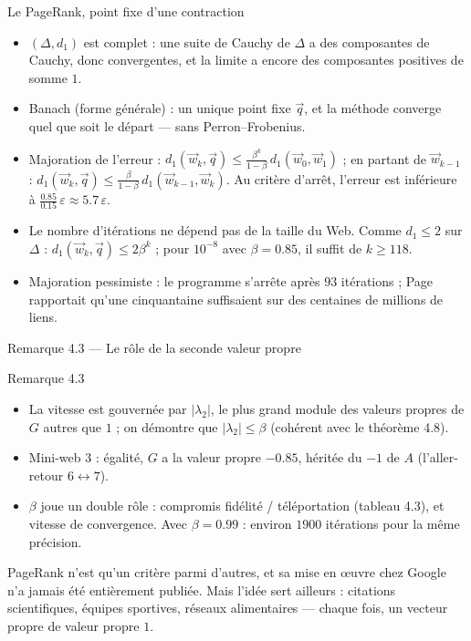 \begin{frame}{Le PageRank, point fixe d'une contraction}
  \small
  \begin{itemize}
    \item $(\Delta,d_1)$ est complet : une suite de Cauchy de $\Delta$ a des
      composantes de Cauchy, donc convergentes, et la limite a encore des
      composantes positives de somme $1$.
    \item Banach (forme générale) : un unique point fixe $\vec q$, et la
      méthode converge quel que soit le départ --- sans Perron--Frobenius.
    \item Majoration de l'erreur :
      $d_1(\vec w_k,\vec q)\leq\frac{\beta^k}{1-\beta}\,d_1(\vec w_0,\vec w_1)$ ;
      en partant de $\vec w_{k-1}$ :
      $d_1(\vec w_k,\vec q)\leq\frac{\beta}{1-\beta}\,d_1(\vec w_{k-1},\vec w_k)$.
      Au critère d'arrêt, l'erreur est inférieure à
      $\frac{\num{0.85}}{\num{0.15}}\,\varepsilon\approx\num{5.7}\,\varepsilon$.
    \item Le nombre d'itérations ne dépend pas de la taille du Web. Comme
      $d_1\leq2$ sur $\Delta$ : $d_1(\vec w_k,\vec q)\leq2\beta^k$ ; pour
      $10^{-8}$ avec $\beta=\num{0.85}$, il suffit de $k\geq118$.
    \item Majoration pessimiste : le programme s'arrête après $93$
      itérations ; Page rapportait qu'une cinquantaine suffisaient sur des
      centaines de millions de liens.
  \end{itemize}
\end{frame}

\begin{frame}{Remarque 4.3 --- Le rôle de la seconde valeur propre}
  \begin{Rem}{Remarque 4.3}
    \small
    \begin{itemize}
      \item La vitesse est gouvernée par $|\lambda_2|$, le plus grand
        module des valeurs propres de $G$ autres que $1$ ; on démontre que
        $|\lambda_2|\leq\beta$ (cohérent avec le théorème 4.8).
      \item Mini-web 3 : égalité, $G$ a la valeur propre $-\num{0.85}$,
        héritée du $-1$ de $A$ (l'aller-retour $6\leftrightarrow7$).
      \item $\beta$ joue un double rôle : compromis fidélité /
        téléportation (tableau 4.3), et vitesse de convergence. Avec
        $\beta=\num{0.99}$ : environ $\num{1900}$ itérations pour la même
        précision.
    \end{itemize}
  \end{Rem}
  \small PageRank n'est qu'un critère parmi d'autres, et sa mise en œuvre
  chez Google n'a jamais été entièrement publiée. Mais l'idée sert
  ailleurs : citations scientifiques, équipes sportives, réseaux
  alimentaires --- chaque fois, un vecteur propre de valeur propre $1$.
\end{frame}

